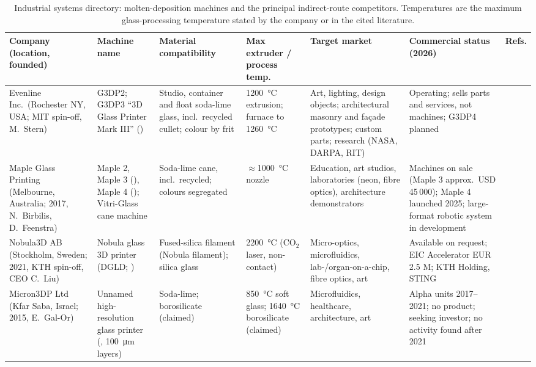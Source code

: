 \begin{table}
  \centering\scriptsize
  \caption{Industrial systems directory: molten-deposition machines and the principal indirect-route competitors. Temperatures are the maximum glass-processing temperature stated by the company or in the cited literature.}
  \label{tab:industry}
  \begin{tabular}{@{}L{2.6cm}L{2.7cm}L{3.2cm}L{2.3cm}L{3.4cm}L{3.6cm}L{2.2cm}@{}}
    \toprule
    Company (location, founded) & Machine name & Material compatibility & Max extruder / process temp. & Target market & Commercial status (2026) & Refs.\\
    \midrule
    Evenline Inc.\ (Rochester NY, USA; MIT spin-off, M.\ Stern) & G3DP2; G3DP3 ``3D Glass Printer Mark III'' () & Studio, container and float soda-lime glass, incl.\ recycled cullet; colour by frit & \SI{1200}{\celsius} extrusion; furnace to \SI{1260}{\celsius} & Art, lighting, design objects; architectural masonry and fa\c{c}ade prototypes; custom parts; research (NASA, DARPA, RIT) & Operating; sells parts and services, not machines; G3DP4 planned & \citep{evenline_web,mit2024masonry,stern2024cgc,rit2023}\\
    Maple Glass Printing (Melbourne, Australia; 2017, N.\ Birbilis, D.\ Feenstra) & Maple 2, Maple 3 (), Maple 4 (); Vitri-Glass cane machine & Soda-lime cane, incl.\ recycled; colours segregated & \(\approx\)\SI{1000}{\celsius} nozzle & Education, art studios, laboratories (neon, fibre optics), architecture demonstrators & Machines on sale (Maple 3 approx.\ USD 45\,000); Maple 4 launched 2025; large-format robotic system in development & \citep{maple_ammedia,maple_aniwaa,threednatives2025,monash_maple}\\
    Nobula3D AB (Stockholm, Sweden; 2021, KTH spin-off, CEO C.\ Liu) & Nobula glass 3D printer (DGLD; ) & Fused-silica filament (Nobula filament); silica glass & \SI{2200}{\celsius} (CO\(_2\) laser, non-contact) & Micro-optics, microfluidics, lab-/organ-on-a-chip, fibre optics, art & Available on request; EIC Accelerator EUR 2.5 M; KTH Holding, STING & \citep{nobula_aniwaa,nobula_fabbaloo,nobula_kthventures,nobula_web}\\
    Micron3DP Ltd (Kfar Saba, Israel; 2015, E.\ Gal-Or) & Unnamed high-resolution glass printer (, \SI{100}{\micro\metre} layers) & Soda-lime; borosilicate (claimed) & \SI{850}{\celsius} soft glass; \SI{1640}{\celsius} borosilicate (claimed) & Microfluidics, healthcare, architecture, art & Alpha units 2017--2021; no product; seeking investor; no activity found after 2021 & \citep{micron3dp_acers,micron3dp_3dprint2017,microfluidics2019}\\

\end{tabular}
\end{table}
